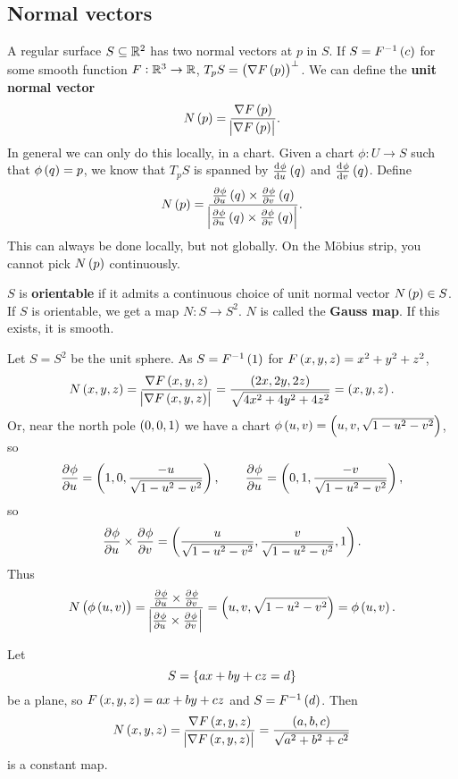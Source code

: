 \pagebreak

\subsection{Normal vectors}

A regular surface $ S \subseteq \mathbb{R}^2 $ has two normal vectors at $ p $ in $ S $. If $ S = F^{-1}\br{c} $ for some smooth function $ F : \mathbb{R}^3 \to \mathbb{R} $, $ T_pS = \br{\nabla F\br{p}}^\perp $. We can define the \textbf{unit normal vector}
$$ N\br{p} = \dfrac{\nabla F\br{p}}{\abs{\nabla F\br{p}}}. $$
In general we can only do this locally, in a chart. Given a chart $ \phi : U \to S $ such that $ \phi\br{q} = p $, we know that $ T_pS $ is spanned by $ \tod{\phi}{u}\br{q} $ and $ \tod{\phi}{v}\br{q} $. Define
$$ N\br{p} = \dfrac{\tpd{\phi}{u}\br{q} \times \tpd{\phi}{v}\br{q}}{\abs{\tpd{\phi}{u}\br{q} \times \tpd{\phi}{v}\br{q}}}. $$
This can always be done locally, but not globally. On the M\"obius strip, you cannot pick $ N\br{p} $ continuously.

\begin{definition}
$ S $ is \textbf{orientable} if it admits a continuous choice of unit normal vector $ N\br{p} \in S $. If $ S $ is orientable, we get a map $ N : S \to S^2 $. $ N $ is called the \textbf{Gauss map}. If this exists, it is smooth.
\end{definition}

\begin{example*}
Let $ S = S^2 $ be the unit sphere. As $ S = F^{-1}\br{1} $ for $ F\br{x, y, z} = x^2 + y^2 + z^2 $,
$$ N\br{x, y, z} = \dfrac{\nabla F\br{x, y, z}}{\abs{\nabla F\br{x, y, z}}} = \dfrac{\br{2x, 2y, 2z}}{\sqrt{4x^2 + 4y^2 + 4z^2}} = \br{x, y, z}. $$
Or, near the north pole $ \br{0, 0, 1} $ we have a chart $ \phi\br{u, v} = \br{u, v, \sqrt{1 - u^2 - v^2}} $, so
$$ \dpd{\phi}{u} = \br{1, 0, \dfrac{-u}{\sqrt{1 - u^2 - v^2}}}, \qquad \dpd{\phi}{u} = \br{0, 1, \dfrac{-v}{\sqrt{1 - u^2 - v^2}}}, $$
so
$$ \dpd{\phi}{u} \times \dpd{\phi}{v} = \br{\dfrac{u}{\sqrt{1 - u^2 - v^2}}, \dfrac{v}{\sqrt{1 - u^2 - v^2}}, 1}. $$
Thus
$$ N\br{\phi\br{u, v}} = \dfrac{\tpd{\phi}{u} \times \tpd{\phi}{v}}{\abs{\tpd{\phi}{u} \times \tpd{\phi}{v}}} = \br{u, v, \sqrt{1 - u^2 - v^2}} = \phi\br{u, v}. $$
\end{example*}

\begin{example*}
Let
$$ S = \cbr{ax + by + cz = d} $$
be a plane, so $ F\br{x, y, z} = ax + by + cz $ and $ S = F^{-1}\br{d} $. Then
$$ N\br{x, y, z} = \dfrac{\nabla F\br{x, y, z}}{\abs{\nabla F\br{x, y, z}}} = \dfrac{\br{a, b, c}}{\sqrt{a^2 + b^2 + c^2}} $$
is a constant map.
\end{example*}

